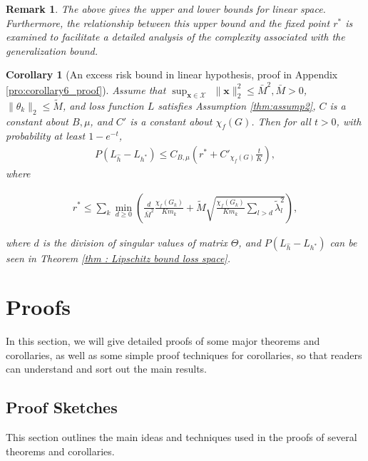 \documentclass{article}
\def\vx{{\mathbf{x}}}
\newtheorem{corollary}{Corollary}
\newtheorem*{remark}{Remark}
\begin{document}
\begin{remark}
    The above gives the upper and lower bounds for linear space.
    Furthermore, the relationship between this upper bound and the fixed point \( r^* \) is examined to facilitate a detailed analysis of the complexity associated with the generalization bound. 
\end{remark}


\begin{corollary}[An excess risk bound in linear hypothesis, proof in Appendix \ref{pro:corollary6_proof}]
\label{thm: loss bound computing2} Assume that $\sup _{\vx \in \mathcal{X}} $ $ \|\vx\|_2^2 \leq \bar{M}^2,\bar{M} > 0$, $\|\theta_k\|_2 \leq \widetilde{M}$, and loss function $L$ satisfies Assumption \ref{thm:assump2}, $C$ is a constant about $B, \mu $, and $C'$ is a constant about $\chi_f(G)$. Then for all $t > 0$,  with probability at least $1 - e^{-t}$, 
\begin{align}
    P (L_{\hat{h}} - L_{h^*}) \leq C_{B,\mu} (r^* + C'_{\chi_f(G)} \frac{t}{K}),
\end{align}
where
\begin{small}
    \begin{align} \label{eq:loss bound computing2 eq}
    r^* \leq \sum_k \min_{d \geq 0} ( \frac{d}{\bar{M}^2} \frac{\chi_f(G_k)}{K m_k} + \widetilde{M} \sqrt{ \frac{\chi_f(G_k)}{K m_k} \sum_{l > d} \widetilde{\lambda}_{l}^2 } ) ,
    \end{align}
\end{small}
where $d$ is the division of singular values of matrix $\Theta$, and $P (L_{\hat{h}} - L_{h^*})$ can be seen in Theorem \ref{thm : Lipschitz bound loss space}. 
\end{corollary}

\section{Proofs} \label{section:proof_all}
In this section, we will give detailed proofs of some major theorems and corollaries, as well as some simple proof techniques for corollaries, so that readers can understand and sort out the main results.
\subsection{Proof Sketches} \label{section: A}
This section outlines the main ideas and techniques used in the proofs of several theorems and corollaries.
\end{document}
